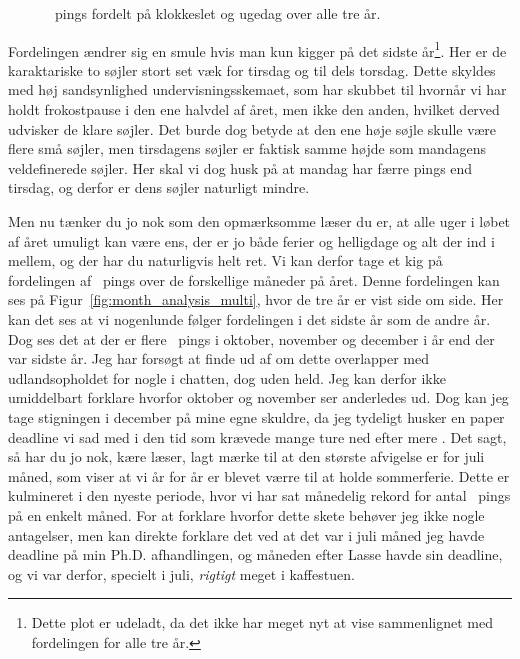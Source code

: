 \begin{article}
\begin{figure}[H]
	\centering
	\resizebox{\columnwidth}{!}{}
	\vspace{-25pt}
	\caption{\protect\coffee\ pings fordelt på klokkeslet og ugedag over alle tre år.}
	\label{fig:weekday_hour_analysis_2022-2025}
\end{figure}

Fordelingen ændrer sig en smule hvis man kun kigger på det sidste år\footnote{Dette plot er udeladt, da det ikke har meget nyt at vise sammenlignet med fordelingen for alle tre år.}. Her er de karaktariske to søjler stort set væk for tirsdag og til dels torsdag. Dette skyldes med høj sandsynlighed undervisningsskemaet, som har skubbet til hvornår vi har holdt frokostpause i den ene halvdel af året, men ikke den anden, hvilket derved udvisker de klare søjler. Det burde dog betyde at den ene høje søjle skulle være flere små søjler, men tirsdagens søjler er faktisk samme højde som mandagens veldefinerede søjler. Her skal vi dog husk på at mandag har færre pings end tirsdag, og derfor er dens søjler naturligt mindre.

Men nu tænker du jo nok som den opmærksomme læser du er, at alle uger i løbet af året umuligt kan være ens, der er jo både ferier og helligdage og alt der ind i mellem, og der har du naturligvis helt ret.
Vi kan derfor tage et kig på fordelingen af \coffee\ pings over de forskellige måneder på året. Denne fordelingen kan ses på Figur~\ref{fig:month_analysis_multi}, hvor de tre år er vist side om side.
Her kan det ses at vi nogenlunde følger fordelingen i det sidste år som de andre år. Dog ses det at der er flere \coffee\ pings i oktober, november og december i år end der var sidste år.
Jeg har forsøgt at finde ud af om dette overlapper med udlandsopholdet for nogle i chatten, dog uden held. Jeg kan derfor ikke umiddelbart forklare hvorfor oktober og november ser anderledes ud. Dog kan jeg tage stigningen i december på mine egne skuldre, da jeg tydeligt husker en paper deadline vi sad med i den tid som krævede mange ture ned efter mere \coffee.
Det sagt, så har du jo nok, kære læser, lagt mærke til at den største afvigelse er for juli måned, som viser at vi år for år er blevet værre til at holde sommerferie.
Dette er kulmineret i den nyeste periode, hvor vi har sat månedelig rekord for antal \coffee\ pings på en enkelt måned.
For at forklare hvorfor dette skete behøver jeg ikke nogle antagelser, men kan direkte forklare det ved at det var i juli måned jeg havde deadline på min Ph.D. afhandlingen, og måneden efter Lasse havde sin deadline, og vi var derfor, specielt i juli, \emph{rigtigt} meget i kaffestuen.


\end{article}
